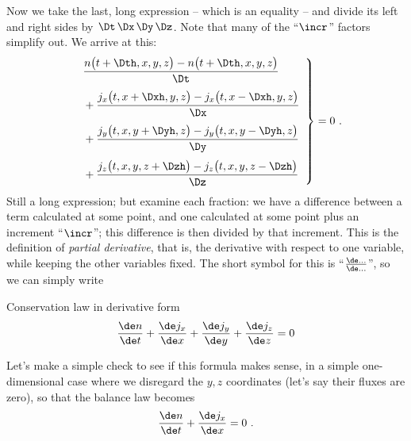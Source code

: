 Now we take the last, long expression -- which is an equality -- and divide its left and right sides by $\Dt\,\Dx\,\Dy\,\Dz$. Note that many of the \enquote{$\incr$} factors simplify out. We arrive at this:
\begin{equation*}
  \label{neq:balance_deriv_incr}
  \left.\begin{aligned}
      &\frac{n\bigl(t+\Dth, x,y,z\bigr)
      -n\bigl(t+\Dth, x,y,z\bigr)}{\Dt}
      \\[\jot]\quad&+\frac{j_{x}\bigl(t, x+\Dxh, y, z\bigr) - j_{x}\bigl(t, x-\Dxh, y, z\bigr)}{\Dx}
      \\[\jot]\quad&+\frac{j_{y}\bigl(t, x, y+\Dyh, z\bigr) - j_{y}\bigl(t, x, y-\Dyh, z\bigr)}{\Dy}
      \\[\jot]\quad&+\frac{j_{z}\bigl(t, x,y,z+\Dzh\bigr) - j_{z}\bigl(t, x,y,z-\Dzh\bigr)}{\Dz}
    \end{aligned}\enspace\right\}=0 \ .
\end{equation*}
Still a long expression; but examine each fraction: we have a difference between a term calculated at some point, and one calculated at some point plus an increment \enquote{${}\incr$}; this difference is then divided by that increment. This is the definition of \emph{partial derivative}, that is, the derivative with respect to one variable, while keeping the other variables fixed. The short symbol for this is \enquote{$\frac{\de\dotso}{\de\dotso}$}, so we can simply write
\begin{definition}{Conservation law in derivative form}
  \begin{equation}
    \label{neq:balance_deriv}
    \frac{\de n}{\de t}%
    +\frac{\de j_{x}}{\de x}%
    +\frac{\de j_{y}}{\de y}%
    +\frac{\de j_{z}}{\de z}%
    = 0
  \end{equation}
\end{definition}
Let's make a simple check to see if this formula makes sense, in a simple one-dimensional case where we disregard the $y,z$ coordinates (let's say their fluxes are zero), so that the balance law becomes
\begin{equation*}
  \frac{\de n}{\de t} + \frac{\de j_{x}}{\de x} = 0 \ .
\end{equation*}
